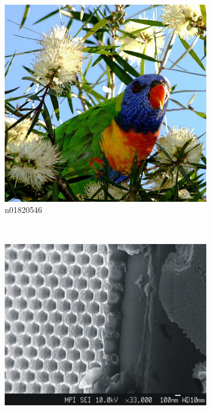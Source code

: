 \documentclass[11pt, a4paper]{article}
\begin{document}
\begin{figure}[h!tb]
    \centering
    \begin{subfigure}[b]{0.30\textwidth}
    		\centering
        \includegraphics[width=\textwidth]{imagenet/examples/n01820546_31.JPEG}
        \caption{n01820546}
        \label{fig:imagenet-examples-1}
    \end{subfigure}
    ~ %
    \begin{subfigure}[b]{0.30\textwidth}
    		\centering
        \includegraphics[width=\textwidth]{imagenet/examples/n03530642_10006.JPEG}

\end{subfigure}
\end{figure}
\end{document}
